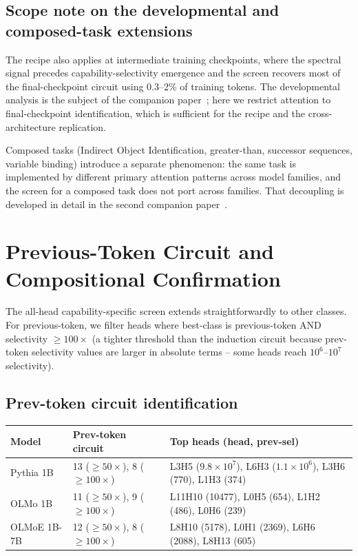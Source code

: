 \documentclass[11pt]{article}
\begin{document}
\subsection{Scope note on the developmental and composed-task extensions}

The recipe also applies at intermediate training checkpoints, where the spectral signal precedes capability-selectivity emergence and the screen recovers most of the final-checkpoint circuit using 0.3--2\% of training tokens. The developmental analysis is the subject of the companion paper~\citep{paper2_developmental}; here we restrict attention to final-checkpoint identification, which is sufficient for the recipe and the cross-architecture replication.

Composed tasks (Indirect Object Identification, greater-than, successor sequences, variable binding) introduce a separate phenomenon: the same task is implemented by different primary attention patterns across model families, and the screen for a composed task does not port across families. That decoupling is developed in detail in the second companion paper~\citep{paper3_circuits}.

\section{Previous-Token Circuit and Compositional Confirmation}
\label{sec:prevtoken}

The all-head capability-specific screen extends straightforwardly to other classes. For previous-token, we filter heads where best-class is previous-token AND selectivity $\geq 100\times$ (a tighter threshold than the induction circuit because prev-token selectivity values are larger in absolute terms -- some heads reach $10^6$--$10^7$ selectivity).

\subsection{Prev-token circuit identification}

\begin{center}
\footnotesize
\begin{tabular}{lll}
\toprule
Model & Prev-token circuit & Top heads (head, prev-sel) \\
\midrule
Pythia 1B   & 13 ($\geq 50\times$), 8 ($\geq 100\times$) & L3H5 ($9.8\!\times\!10^7$), L6H3 ($1.1\!\times\!10^6$), L3H6 (770), L1H3 (374) \\
OLMo 1B     & 11 ($\geq 50\times$), 9 ($\geq 100\times$) & L11H10 (10477), L0H5 (654), L1H2 (486), L0H6 (239) \\
OLMoE 1B-7B & 12 ($\geq 50\times$), 8 ($\geq 100\times$) & L8H10 (5178), L0H1 (2369), L6H6 (2088), L8H13 (605) \\
\bottomrule
\end{tabular}
\end{center}
\end{document}
